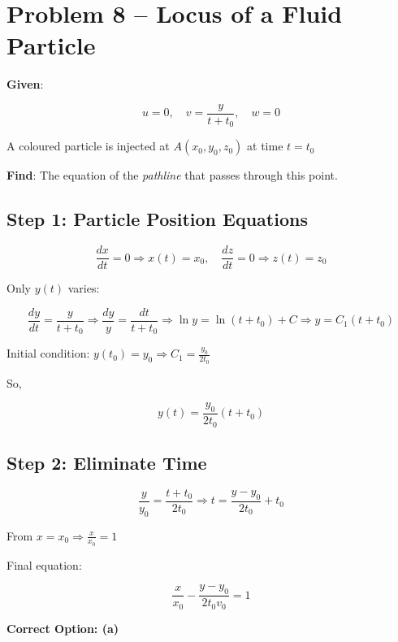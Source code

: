 \documentclass{article}
\begin{document}
\section*{Problem 8 – Locus of a Fluid Particle}

\textbf{Given}:

\[
u = 0, \quad v = \frac{y}{t + t_0}, \quad w = 0
\]

A coloured particle is injected at \( A(x_0, y_0, z_0) \) at time \( t = t_0 \)

\textbf{Find}: The equation of the \textit{pathline} that passes through this point.

\subsection*{Step 1: Particle Position Equations}

\[
\frac{dx}{dt} = 0 \Rightarrow x(t) = x_0,\quad
\frac{dz}{dt} = 0 \Rightarrow z(t) = z_0
\]

Only \( y(t) \) varies:

\[
\frac{dy}{dt} = \frac{y}{t + t_0}
\Rightarrow \frac{dy}{y} = \frac{dt}{t + t_0}
\Rightarrow \ln y = \ln(t + t_0) + C \Rightarrow y = C_1 (t + t_0)
\]

Initial condition: \( y(t_0) = y_0 \Rightarrow C_1 = \frac{y_0}{2t_0} \)

So,

\[
y(t) = \frac{y_0}{2t_0}(t + t_0)
\]

\subsection*{Step 2: Eliminate Time}

\[
\frac{y}{y_0} = \frac{t + t_0}{2t_0} \Rightarrow
t = \frac{y - y_0}{2t_0} + t_0
\]

From \( x = x_0 \Rightarrow \frac{x}{x_0} = 1 \)

Final equation:

\[
\boxed{\frac{x}{x_0} - \frac{y - y_0}{2t_0 v_0} = 1}
\]

\textbf{Correct Option: (a)}
\end{document}
